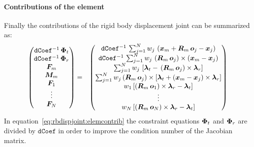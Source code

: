 \paragraph{Contributions of the element}
Finally the contributions of the rigid body displacement joint can be summarized as:
\begin{eqnarray}
\begin{pmatrix}
\texttt{dCoef}^{-1} \, \bm{\Phi}_t \\
\texttt{dCoef}^{-1} \, \bm{\Phi}_r \\
\bm{F}_m \\
\bm{M}_m \\
\bm{F}_1 \\
\vdots{} \\
\bm{F}_N
\end{pmatrix}
& = &
\begin{pmatrix}
\texttt{dCoef}^{-1} \, \sum_{j=1}^{N} w_j \, \left(\bm{x}_m + \bm{R}_m \, \bm{o}_j - \bm{x}_j\right) \\
\texttt{dCoef}^{-1} \, \sum_{j=1}^{N} w_j \, \left(\bm{R}_m \, \bm{o}_j \right)\times\left(\bm{x}_m - \bm{x}_j \right) \\
\sum_{j=1}^N w_j\,\left[\bm{\lambda}_t - \,\left(\bm{R}_m\,\bm{o}_j\right)\times\bm{\lambda}_r\right] \\
\sum_{j=1}^N w_j\left(\bm{R}_m\,\bm{o}_j\right)\times\left[\bm{\lambda}_t+\left(\bm{x}_m - \bm{x}_j\right)\times\bm{\lambda}_r\right] \\
w_1\left[\left(\bm{R}_m\,\bm{o}_1\right)\times\bm{\lambda}_r - \bm{\lambda}_t\right] \\
\vdots{} \\
w_N\left[\left(\bm{R}_m\,\bm{o}_N\right)\times\bm{\lambda}_r - \bm{\lambda}_t\right]
\end{pmatrix} \label{eq:rbdispjoint:elemcontrib}
\end{eqnarray}
In equation~\ref{eq:rbdispjoint:elemcontrib} the constraint equations $\bm{\Phi}_t$ and $\bm{\Phi}_r$
are divided by $\texttt{dCoef}$ in order to improve the condition number of the Jacobian matrix.
